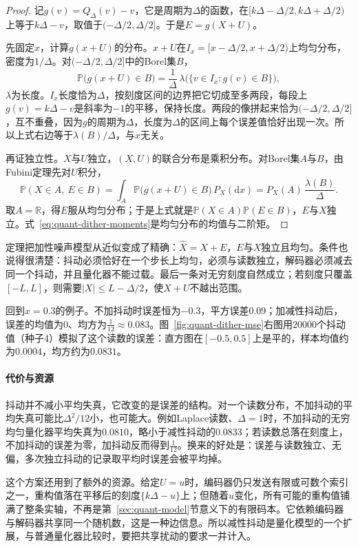 \begin{proof}
记$g(v)=Q_{\Delta}(v)-v$，它是周期为$\Delta$的函数，在$[k\Delta-\Delta/2,k\Delta+\Delta/2)$上等于$k\Delta-v$，取值于$(-\Delta/2,\Delta/2]$。于是$E=g(X+U)$。

先固定$x$，计算$g(x+U)$的分布。$x+U$在$I_x=[x-\Delta/2,x+\Delta/2)$上均匀分布，密度为$1/\Delta$。对$(-\Delta/2,\Delta/2]$中的Borel集$B$，
\[
 \mathbb{P}\bigl(g(x+U)\in B\bigr)=\frac{1}{\Delta}\,\lambda\bigl(\{v\in I_x:g(v)\in B\}\bigr) ,
\]
$\lambda$为长度。$I_x$长度恰为$\Delta$，按刻度区间的边界把它切成至多两段，每段上$g(v)=k\Delta-v$是斜率为$-1$的平移，保持长度。两段的像拼起来恰为$(-\Delta/2,\Delta/2]$，互不重叠，因为$g$的周期为$\Delta$，长度为$\Delta$的区间上每个误差值恰好出现一次。所以上式右边等于$\lambda(B)/\Delta$，与$x$无关。

再证独立性。$X$与$U$独立，$(X,U)$的联合分布是乘积分布。对Borel集$A$与$B$，由Fubini定理先对$U$积分，
\[
 \mathbb{P}(X\in A,\ E\in B)=\int_{A}\mathbb{P}\bigl(g(x+U)\in B\bigr)\,P_X(\mathrm{d}x)=P_X(A)\,\frac{\lambda(B)}{\Delta} .
\]
取$A=\mathbb{R}$，得$E$服从均匀分布；于是上式就是$\mathbb{P}(X\in A)\mathbb{P}(E\in B)$，$E$与$X$独立。式~\eqref{eq:quant-dither-moments}是均匀分布的均值与二阶矩。
\end{proof}

定理把加性噪声模型从近似变成了精确：$\hat{X}=X+E$，$E$与$X$独立且均匀。条件也说得很清楚：抖动必须恰好在一个步长上均匀，必须与读数独立，解码器必须减去同一个抖动，并且量化器不能过载。最后一条对无穷刻度自然成立；若刻度只覆盖$[-L,L]$，则需要$\lvert X\rvert\leq L-\Delta/2$，使$X+U$不越出范围。

回到$x=0.3$的例子。不加抖动时误差恒为$-0.3$，平方误差$0.09$；加减性抖动后，误差的均值为$0$、均方为$\tfrac1{12}\approx0.083$。图~\ref{fig:quant-dither-mse}右图用$20000$个抖动值（种子4）模拟了这个读数的误差：直方图在$[-0.5,0.5]$上是平的，样本均值约为$0.0004$，均方约为$0.0831$。

\paragraph{代价与资源}
抖动并不减小平均失真，它改变的是误差的结构。对一个读数分布，不加抖动的平均失真可能比$\Delta^{2}/12$小，也可能大。例如Laplace读数、$\Delta=1$时，不加抖动的无穷均匀量化器平均失真为$0.0810$，略小于减性抖动的$0.0833$；若读数总落在刻度上，不加抖动的误差为零，加抖动反而得到$\tfrac1{12}$。换来的好处是：误差与读数独立、无偏，多次独立抖动的记录取平均时误差会被平均掉。

这个方案还用到了额外的资源。给定$U=u$时，编码器仍只发送有限或可数个索引之一，重构值落在平移后的刻度$\{k\Delta-u\}$上；但随着$u$变化，所有可能的重构值铺满了整条实轴，不再是第~\ref{sec:quant-model}节意义下的有限码本。它依赖编码器与解码器共享同一个随机数，这是一种边信息。所以减性抖动是量化模型的一个扩展，与普通量化器比较时，要把共享扰动的要求一并计入。

